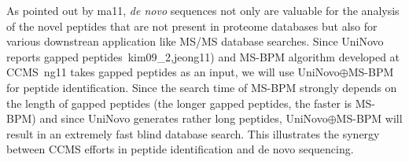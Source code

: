 %
%
%



As pointed out by \cite{unv}{ma11}, {\em de novo} sequences not only are valuable for the analysis of the novel peptides that are not present in proteome databases but also for various downstrean application like MS/MS database searches. 
 Since UniNovo reports  
gapped peptides~\cite{unv}{kim09_2,jeong11}) and  MS-BPM algorithm developed at CCMS~\cite{unv}{ng11} takes gapped peptides as an input, we will use  UniNovo$\oplus$MS-BPM for peptide identification.  
 Since the search time of MS-BPM strongly depends on the length of gapped peptides (the longer gapped peptides, the faster is MS-BPM) and since UniNovo generates rather long peptides, UniNovo$\oplus$MS-BPM will result in an  extremely fast blind database search. This illustrates the synergy between CCMS efforts in peptide identification and de novo sequencing.  


